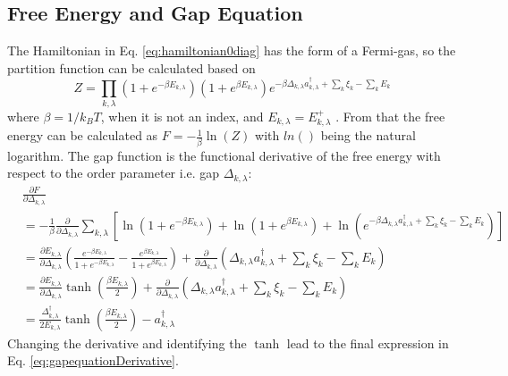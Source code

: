 \subsection{Free Energy and Gap Equation} \label{sec:free_energy}
The Hamiltonian in Eq. \eqref{eq:hamiltonian0diag} has the form of a Fermi-gas, so the partition function can be calculated based on 
\begin{equation}
    Z = \prod_{k, \lambda} \left( 1 + e^{-\beta E_{k, \lambda}}\right)\left( 1 + e^{\beta E_{k, \lambda}}\right)e^{-\beta \Delta_{k, \lambda}a^{\dag}_{k, \lambda}+\sum_k \xi_k - \sum_k E_k}
\end{equation}
where $\beta = 1/k_B T$, when it is not an index, and $E_{k, \lambda}= E^+_{k, \lambda}$ \cite{sudbo_asle_superconductivity_2004}.\newline
From that the free energy can be calculated as $F = - \frac{1}{\beta}\ln(Z)$ with $ln()$ being the natural logarithm.\newline
The gap function is the functional derivative of the free energy with respect to the order parameter i.e. gap $\Delta_{k, \lambda}$:
\begin{align}
    & \frac{\partial F}{\partial \Delta_{k, \lambda}} \\ \nonumber
    &= -\frac{1}{\beta} \frac{\partial}{\partial \Delta_{k, \lambda}} \sum_{k, \lambda} \left[ \ln\left( 1 + e^{-\beta E_{k, \lambda}}\right) + \ln \left( 1 + e^{\beta E_{k, \lambda}}\right)+ \ln \left( e^{-\beta \Delta_{k, \lambda} a^{\dag}_{k, \lambda}+\sum_k \xi_k - \sum_k E_k}\right)  \right] \\
    &= \frac{\partial E_{k, \lambda}}{\partial \Delta_{k, \lambda}}\left( \frac{e^{-\beta E_{k, \lambda}}}{1 + e^{-\beta E_{k, \lambda}}} - \frac{e^{\beta E_{k, \lambda}}}{1 + e^{\beta E_{k, \lambda}}}\right) + \frac{\partial}{\partial \Delta_{k, \lambda} }\left( \Delta_{k, \lambda} a^{\dag}_{k, \lambda} +\sum_k \xi_k - \sum_k E_k \right) \nonumber \\
    &= \frac{\partial E_{k, \lambda}}{\partial \Delta_{k, \lambda}}\tanh{\left( \frac{\beta E_{k, \lambda}}{2}\right)} + \frac{\partial}{\partial \Delta_{k, \lambda} } \left( \Delta_{k, \lambda} a^{\dag}_{k, \lambda} +\sum_k \xi_k - \sum_k E_k \right) \nonumber \\
    &= \frac{\Delta^{\dag}_{k, \lambda}}{2 E_{k, \lambda}}\tanh{\left( \frac{\beta E_{k, \lambda}}{2}\right)} - a^{\dag}_{k, \lambda} \label{eq:gapequationDerivative}
\end{align}
Changing the derivative and identifying the $\tanh$ lead to the final expression in Eq. \eqref{eq:gapequationDerivative}.\newline
